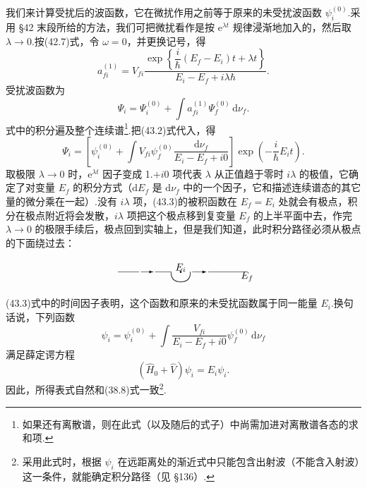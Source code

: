 我们来计算受扰后的波函数，它在微扰作用之前等于原来的未受扰波函数 $\psi_i^{(0)}$.采用 §42 末段所给的方法，我们可把微扰看作是按 $\mathrm{e}^{\lambda t}$ 规律浸渐地加入的，然后取 $\lambda\to0$.按(42.7)式，令 $\omega=0$，并更换记号，得
\begin{equation}
  a_{fi}^{(1)}=V_{fi}\frac{\exp\left\{\dfrac{i}{\hbar}(E_f-E_i)t+\lambda t\right\}}
  {E_i-E_f+i\lambda\hbar}.
\end{equation}
受扰波函数为
\begin{equation*}
  \varPsi_i=\varPsi_i^{(0)}+\int a_{fi}^{(1)}\varPsi_f^{(0)}\,\mathrm{d}\nu_f.
\end{equation*}
式中的积分遍及整个连续谱\footnote{如果还有离散谱，则在此式（以及随后的式子）中尚需加进对离散谱各态的求和项.}.把(43.2)式代入，得
\begin{equation}
  \varPsi_i=\left[\psi_i^{(0)}+\int V_{fi}\psi_f^{(0)}
  \frac{\mathrm{d}\nu_f}{E_i-E_f+i0}\right]
  \exp\left(-\frac{i}{\hbar}E_it\right).
\end{equation}
取极限 $\lambda\to0$ 时，$\mathrm{e}^{\lambda t}$ 因子变成 1.$+i0$ 项代表 $\lambda$ 从正值趋于零时 $i\lambda$ 的极值，它确定了对变量 $E_f$ 的积分方式（$\mathrm{d}E_f$ 是 $\mathrm{d}\nu_f$ 中的一个因子，它和描述连续谱态的其它量的微分乘在一起）.没有 $i\lambda$ 项，(43.3)的被积函数在 $E_f=E_i$ 处就会有极点，积分在极点附近将会发散，$i\lambda$ 项把这个极点移到复变量 $E_f$ 的上半平面中去，作完 $\lambda\to0$ 的极限手续后，极点回到实轴上，但是我们知道，此时积分路径必须从极点的下面绕过去：
\begin{equation}
  \setlength{\unitlength}{0.9pt}%
  \begin{picture}(152,34)(0,0)
    \put(2,16){\line(1,0){24}}
    \put(28,16){\vector(1,0){14}}
    \put(44,16){\line(1,0){18}}
    \qbezier(62,16)(62,5)(73,5)
    \qbezier(73,5)(84,5)(84,16)
    \put(86,16){\vector(1,0){16}}
    \put(104,16){\line(1,0){44}}
    \put(73,16){\circle*{2}}
    \put(73,16){\makebox(0,0)[b]{$E_i$}}
    \put(148,16){\makebox(0,0)[t]{$E_f$}}
  \end{picture}
\end{equation}
(43.3)式中的时间因子表明，这个函数和原来的未受扰函数属于同一能量 $E_i$.换句话说，下列函数
\begin{equation}
  \psi_i=\psi_i^{(0)}+\int\frac{V_{fi}}{E_i-E_f+i0}\psi_f^{(0)}\,\mathrm{d}\nu_f
\end{equation}
满足薛定谔方程
\begin{equation*}
  \left(\hat{H}_0+\hat{V}\right)\psi_i=E_i\psi_i.
\end{equation*}
因此，所得表式自然和(38.8)式一致\footnote{采用此式时，根据 $\psi_i$ 在远距离处的渐近式中只能包含出射波（不能含入射波）这一条件，就能确定积分路径（见 §136）.}.

